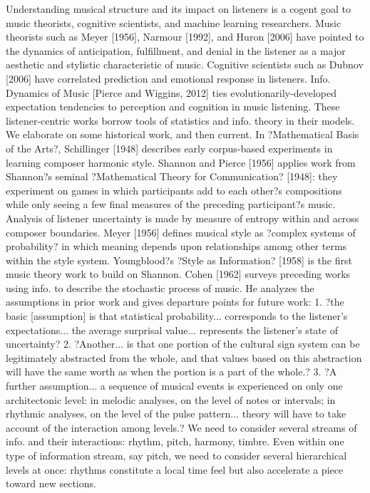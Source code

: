 \documentclass[final,authoryear,11pt,times]{elsarticle}
\begin{document}
Understanding musical structure and its impact on listeners is a cogent goal to music theorists, cognitive scientists, and machine learning researchers. Music theorists such as Meyer [1956], Narmour [1992], and Huron [2006] have pointed to the dynamics of anticipation, fulfillment, and denial in the listener as a major aesthetic and stylistic characteristic of music. Cognitive scientists such as Dubnov [2006] have correlated prediction and emotional response in listeners. Info. Dynamics of Music [Pierce and Wiggins, 2012] ties evolutionarily-developed expectation tendencies to perception and cognition in music listening. These listener-centric works borrow tools of statistics and info. theory in their models. We elaborate on some historical work, and then current.
In ?Mathematical Basis of the Arts?, Schillinger [1948] describes early corpus-based experiments in learning composer harmonic style. Shannon and Pierce [1956] applies work from Shannon?s seminal ?Mathematical Theory for Communication? [1948]: they experiment on games in which participants add to each other?s compositions while only seeing a few final measures of the preceding participant?s music. Analysis of listener uncertainty is made by measure of entropy within and across composer boundaries. Meyer [1956] defines musical style as ?complex systems of probability? in which meaning depends upon relationships among other terms within the style system. Youngblood?s ?Style as Information? [1958] is the first music theory work to build on Shannon. Cohen [1962] surveys preceding works using info. to describe the stochastic process of music. He analyzes the assumptions in prior work and gives departure points for future work:
1. ?the basic [assumption] is that statistical probability... corresponds to the listener's expectations... the average surprisal value... represents the listener's state of uncertainty?
2. ?Another... is that one portion of the cultural sign system can be legitimately abstracted from the whole, and that values based on this abstraction will have the same worth as when the portion is a part of the whole.?
3. ?A further assumption... a sequence of musical events is experienced on only one architectonic level: in melodic analyses, on the level of notes or intervals; in rhythmic analyses, on the level of the pulse pattern... theory will have to take account of the interaction among levels.?
We need to consider several streams of info. and their interactions: rhythm, pitch, harmony, timbre. Even within one type of information stream, say pitch, we need to consider several hierarchical levels at once: rhythms constitute a local time feel but also accelerate a piece toward new sections.
\end{document}
